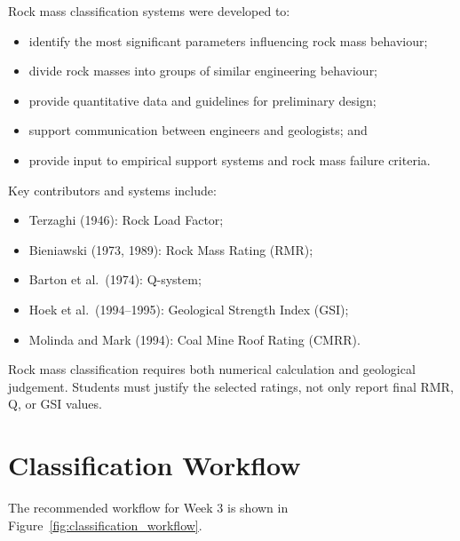 \documentclass[a4paper,12pt]{article}
\begin{document}
Rock mass classification systems were developed to:
\begin{itemize}
    \item identify the most significant parameters influencing rock mass behaviour;
    \item divide rock masses into groups of similar engineering behaviour;
    \item provide quantitative data and guidelines for preliminary design;
    \item support communication between engineers and geologists; and
    \item provide input to empirical support systems and rock mass failure criteria.
\end{itemize}

Key contributors and systems include:
\begin{itemize}
    \item Terzaghi (1946): Rock Load Factor;
    \item Bieniawski (1973, 1989): Rock Mass Rating (RMR);
    \item Barton et al.\ (1974): Q-system;
    \item Hoek et al.\ (1994--1995): Geological Strength Index (GSI);
    \item Molinda and Mark (1994): Coal Mine Roof Rating (CMRR).
\end{itemize}

\begin{keybox}
Rock mass classification requires both numerical calculation and geological judgement.
Students must justify the selected ratings, not only report final RMR, Q, or GSI values.
\end{keybox}

\section{Classification Workflow}

The recommended workflow for Week 3 is shown in Figure~\ref{fig:classification_workflow}.
\end{document}
